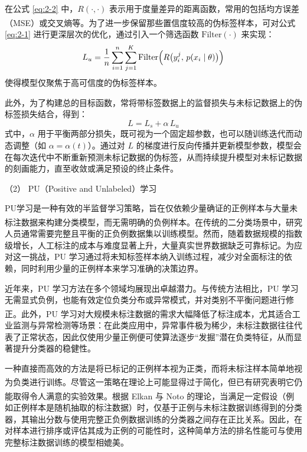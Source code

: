 在公式 \eqref{eq:2-2} 中，$ R(\cdot, \cdot) $ 表示用于度量差异的距离函数，常用的包括均方误差（MSE）或交叉熵等\textsuperscript{\cite{van2020survey}}。为了进一步保留那些置信度较高的伪标签样本，可对公式 \eqref{eq:2-1} 进行更深层次的优化，通过引入一个筛选函数 $\mathrm{Filter}(\cdot)$ 来实现：
\begin{equation}\label{eq:2-3}
	L_u = \frac{1}{n} \sum_{i=1}^{n} \sum_{j=1}^{K} 
	\mathrm{Filter} \Bigl( R \bigl( y_i^{j},\, p(x_i \mid \theta) \bigr) \Bigr)
\end{equation}
使得模型仅聚焦于高可信度的伪标签样本。

此外，为了构建总的目标函数，常将带标签数据上的监督损失与未标记数据上的伪标签损失结合，得到：
\begin{equation}\label{eq:2-4}
	L = L_s + \alpha \, L_u
\end{equation}
式中，$ \alpha $ 用于平衡两部分损失，既可视为一个固定超参数，也可以随训练迭代而动态调整（如 $\alpha = \alpha(t)$）。通过对 $ L $ 的梯度进行反向传播并更新模型参数，模型会在每次迭代中不断重新预测未标记数据的伪标签，从而持续提升模型对未标记数据的刻画能力，直至收敛或满足预设的终止条件。


（2） PU（Positive and Unlabeled）学习

PU学习是一种有效的半监督学习策略，旨在仅依赖少量确证的正例样本与大量未标注数据来构建分类模型，而无需明确的负例样本\textsuperscript{\cite{elkan2008learning,mordelet2013bagging}}。在传统的二分类场景中，研究人员通常需要完整且平衡的正负例数据集以训练模型。然而，随着数据规模的指数级增长，人工标注的成本与难度显著上升，大量真实世界数据缺乏可靠标记。为应对这一挑战，PU 学习通过将未知标签样本纳入训练过程，减少对全面标注的依赖，同时利用少量的正例样本来学习准确的决策边界。

近年来，PU 学习方法在多个领域均展现出卓越潜力。与传统方法相比，PU 学习无需显式负例，也能有效定位负类分布或异常模式，并对类别不平衡问题进行修正\textsuperscript{\cite{elkan2008learning}}。此外，PU 学习对大规模未标注数据的需求大幅降低了标注成本，尤其适合工业监测与异常检测等场景：在此类应用中，异常事件极为稀少，未标注数据往往代表了正常状态，因此仅使用少量正例便可使算法逐步“发掘”潜在负类特征，从而显著提升分类器的稳健性。

一种直接而高效的方法是将已标记的正例样本视为正类，而将未标注样本简单地视为负类进行训练\textsuperscript{\cite{elkan2008learning}}。尽管这一策略在理论上可能显得过于简化，但已有研究表明它仍能取得令人满意的实验效果。根据 Elkan 与 Noto\textsuperscript{\cite{elkan2008learning}} 的理论，当满足一定假设（例如正例样本是随机抽取的标注数据）时，仅基于正例与未标注数据训练得到的分类器，其输出分数与使用完整正负例数据训练的分类器之间存在正比关系。因此，在对样本进行排序或评估其成为正例的可能性时，这种简单方法的排名性能可与使用完整标注数据训练的模型相媲美。

